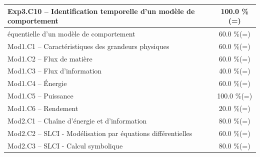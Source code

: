 \begin{center}
\begin{tabular}{|p{.7\linewidth}|c|}
Exp3.C10 -- Identification temporelle d’un modèle de comportement&100.0 \%(=)\\ \hline 
équentielle d’un modèle de comportement&60.0 \%(=)\\ \hline 
Mod1.C1 -- Caractéristiques des grandeurs physiques&60.0 \%(=)\\ \hline 
Mod1.C2 -- Flux de matière&60.0 \%(=)\\ \hline 
Mod1.C3 -- Flux d’information&40.0 \%(=)\\ \hline 
Mod1.C4 -- Énergie&60.0 \%(=)\\ \hline 
Mod1.C5 -- Puissance&100.0 \%(=)\\ \hline 
Mod1.C6 -- Rendement&20.0 \%(=)\\ \hline 
Mod2.C1 -- Chaîne d’énergie et d'information&80.0 \%(=)\\ \hline 
Mod2.C2 -- SLCI - Modélisation par équations différentielles&60.0 \%(=)\\ \hline 
Mod2.C3 -- SLCI - Calcul symbolique&80.0 \%(=)\\ \hline 
\end{tabular} 
\end{center} 
\normalsize 
 
